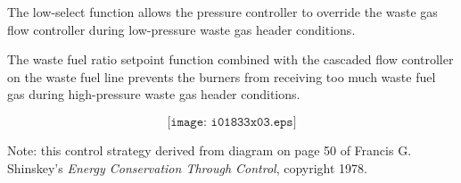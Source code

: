 The low-select function allows the pressure controller to override the waste gas flow controller during low-pressure waste gas header conditions.

The waste fuel ratio setpoint function combined with the cascaded flow controller on the waste fuel line prevents the burners from receiving too much waste fuel gas during high-pressure waste gas header conditions.

$$\texttt{[image: i01833x03.eps]}$$

Note: this control strategy derived from diagram on page 50 of Francis G. Shinskey's {\it Energy Conservation Through Control}, copyright 1978.




